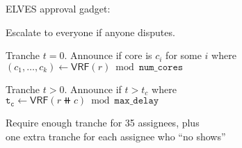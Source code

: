 \documentclass{beamer}
\begin{document}
\begin{frame}

ELVES approval gadget: \\ \bigskip\bigskip

Escalate to everyone if anyone disputes. \\ \medskip

Tranche $t=0$.  Announce if core is $c_i$ for some $i$ where \\ \smallskip
\hspace{10pt}  $(c_1,\ldots,c_k) \leftarrow \mathsf{VRF}(r) \bmod \mathtt{num\_cores}$ \\ \medskip

Tranche $t>0$.  Announce if $t > t_c$ where \\ \smallskip
\hspace{10pt}  $\mathtt{t_c} \leftarrow \mathsf{VRF}(r \doubleplus c) \bmod \mathtt{max\_delay}$  \\ \medskip

Require enough tranche for 35 assignees, plus \\ \smallskip
\hspace{5pt} one extra tranche for each assignee who ``no shows'' \\ \medskip

\end{frame}
\end{document}
